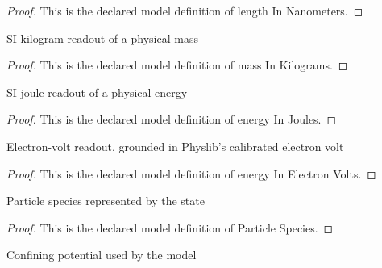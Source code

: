 \begin{proof}
  This is the declared model definition of length In Nanometers.
\end{proof}
\begin{definition}
  \label{def:physics:phyx-mini-0508:phyxminiproblems-problemphyxmini0508-massinkilograms}
  SI kilogram readout of a physical mass
\end{definition}
\begin{proof}
  This is the declared model definition of mass In Kilograms.
\end{proof}
\begin{definition}
  \label{def:physics:phyx-mini-0508:phyxminiproblems-problemphyxmini0508-energyinjoules}
  SI joule readout of a physical energy
\end{definition}
\begin{proof}
  This is the declared model definition of energy In Joules.
\end{proof}
\begin{definition}
  \label{def:physics:phyx-mini-0508:phyxminiproblems-problemphyxmini0508-energyinelectronvolts}
  Electron-volt readout, grounded in Physlib's calibrated electron volt
\end{definition}
\begin{proof}
  This is the declared model definition of energy In Electron Volts.
\end{proof}
\begin{definition}
  \label{def:physics:phyx-mini-0508:phyxminiproblems-problemphyxmini0508-particlespecies}
  Particle species represented by the state
\end{definition}
\begin{proof}
  This is the declared model definition of Particle Species.
\end{proof}
\begin{definition}
  \label{def:physics:phyx-mini-0508:phyxminiproblems-problemphyxmini0508-confinementmodel}
  Confining potential used by the model
\end{definition}
